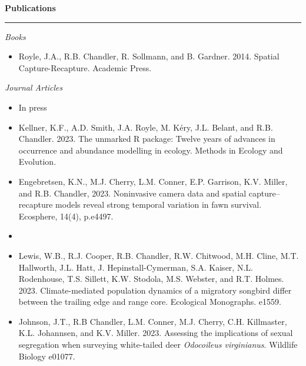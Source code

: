 \vspace{0.5cm}

{\large \bf Publications} \\
\rule[3mm]{\textwidth}{0.3mm}

\emph{Books}
\begin{itemize}

\item Royle, J.A., R.B. Chandler, R. Sollmann, and B. Gardner. 2014. Spatial
Capture-Recapture. Academic Press. 

\end{itemize}

\vspace{0.5cm}

\emph{Journal Articles}

\begin{itemize}

\item[] {\centering In press \\}

\item Kellner, K.F., A.D. Smith, J.A. Royle, M. K\'ery, J.L. Belant,
  and R.B. Chandler. 2023. The unmarked R package: Twelve years of
  advances in occurrence and abundance modelling in ecology. Methods
  in Ecology and Evolution. 
  
\item Engebretsen, K.N., M.J. Cherry, L.M. Conner, E.P. Garrison,
  K.V. Miller, and R.B. Chandler, 2023. Noninvasive camera data and
  spatial capture–recapture models reveal strong temporal variation in
  fawn survival. Ecosphere, 14(4), p.e4497. 

\item[] { \\}

\item Lewis, W.B., R.J. Cooper, R.B. Chandler, R.W. Chitwood,
  M.H. Cline, M.T. Hallworth, J.L. Hatt, J. Hepinstall-Cymerman,
  S.A. Kaiser, N.L. Rodenhouse, T.S. Sillett, K.W. Stodola,
  M.S. Webster, and R.T. Holmes. 2023. Climate-mediated population
  dynamics of a migratory songbird differ between the trailing edge
  and range core. Ecological Monographs. e1559. 

\item Johnson, J.T., R.B Chandler, L.M. Conner, M.J. Cherry,
  C.H. Killmaster, K.L. Johannsen, and K.V. Miller. 2023. Assessing
  the implications of sexual segregation when surveying white-tailed
  deer {\it Odocoileus virginianus}. Wildlife Biology e01077. 


\end{itemize}
